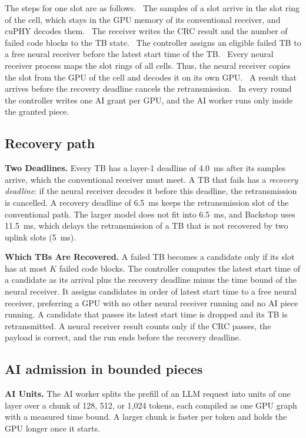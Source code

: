 \documentclass[acmsmall,screen,review,anonymous]{acmart}
\newcommand{\sys}{Backstop\xspace}
\begin{document}
The steps for one slot are as follows. ~The samples of a slot arrive in the slot ring of the cell,
which stays in the GPU memory of its conventional receiver, and cuPHY decodes them. ~The receiver
writes the CRC result and the number of failed code blocks to the TB state. ~The controller
assigns an eligible failed TB to a free neural receiver before the latest start time of the TB.
~Every neural receiver process maps the slot rings of all cells. Thus, the neural receiver copies
the slot from the GPU of the cell and decodes it on its own GPU. ~A result that arrives before
the recovery deadline cancels the retransmission. ~In every round the controller writes one AI
grant per GPU, and the AI worker runs only inside the granted piece.

\subsection{Recovery path}

\noindent\textbf{Two Deadlines.} Every TB has a layer-1 deadline of 4.0~ms after its samples arrive, which
the conventional receiver must meet. A TB that fails has a \emph{recovery deadline}: if the neural receiver
decodes it before this deadline, the retransmission is cancelled. A recovery deadline of 6.5~ms keeps the
retransmission slot of the conventional path. The larger model does not fit into 6.5~ms, and \sys uses
11.5~ms, which delays the retransmission of a TB that is not recovered by two uplink slots (5~ms).

\noindent\textbf{Which TBs Are Recovered.} A failed TB becomes a candidate only if its slot has at most $K$
failed code blocks. The controller computes the latest start time of a candidate as its arrival plus the
recovery deadline minus the time bound of the neural receiver. It assigns candidates in order of latest
start time to a free neural receiver, preferring a GPU with no other neural receiver running and no AI piece
running. A candidate that passes its latest start time is dropped and its TB is retransmitted. A neural
receiver result counts only if the CRC passes, the payload is correct, and the run ends before the recovery
deadline.

\subsection{AI admission in bounded pieces}

\noindent\textbf{AI Units.} The AI worker splits the prefill of an LLM request into units of one layer over
a chunk of 128, 512, or 1,024 tokens, each compiled as one GPU graph with a measured time bound. A larger
chunk is faster per token and holds the GPU longer once it starts.
\end{document}
